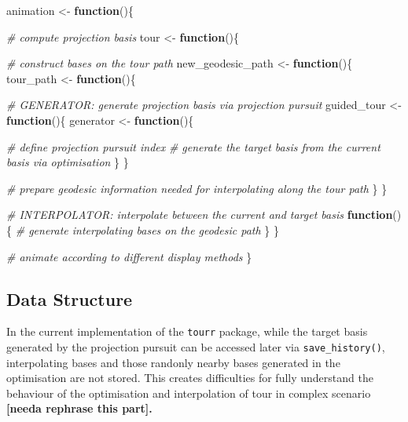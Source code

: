 \documentclass[12pt]{article}
\newenvironment{Shaded}{\begin{snugshade}}{\end{snugshade}}
\newcommand{\CommentTok}[1]{\textcolor[rgb]{0.56,0.35,0.01}{\textit{#1}}}
\newcommand{\ControlFlowTok}[1]{\textcolor[rgb]{0.13,0.29,0.53}{\textbf{#1}}}
\newcommand{\NormalTok}[1]{#1}
\newcommand{\StringTok}[1]{\textcolor[rgb]{0.31,0.60,0.02}{#1}}
\begin{document}
\begin{Shaded}
\begin{Highlighting}[]
\NormalTok{animation <-}\StringTok{ }\ControlFlowTok{function}\NormalTok{()\{}
  
  \CommentTok{# compute projection basis }
\NormalTok{  tour <-}\StringTok{ }\ControlFlowTok{function}\NormalTok{()\{}
    
    \CommentTok{# construct bases on the tour path}
\NormalTok{    new_geodesic_path <-}\StringTok{ }\ControlFlowTok{function}\NormalTok{()\{}
\NormalTok{      tour_path <-}\StringTok{ }\ControlFlowTok{function}\NormalTok{()\{}
        
        \CommentTok{# GENERATOR: generate projection basis via projection pursuit}
\NormalTok{        guided_tour <-}\StringTok{ }\ControlFlowTok{function}\NormalTok{()\{}
\NormalTok{          generator <-}\StringTok{ }\ControlFlowTok{function}\NormalTok{()\{}
            
            \CommentTok{# define projection pursuit index}
            \CommentTok{# generate the target basis from the current basis via optimisation}
\NormalTok{          \}}
\NormalTok{        \}}
        
        \CommentTok{# prepare geodesic information needed for interpolating along the tour path}
\NormalTok{      \}}
\NormalTok{    \}}
    
    \CommentTok{# INTERPOLATOR: interpolate between the current and target basis }
    \ControlFlowTok{function}\NormalTok{()\{}
      \CommentTok{# generate interpolating bases on the geodesic path}
\NormalTok{    \}}
\NormalTok{  \}}
  
  \CommentTok{# animate according to different display methods}
\NormalTok{\}}
\end{Highlighting}
\end{Shaded}

\hypertarget{data-structure}{%
\subsection{Data Structure}\label{data-structure}}

In the current implementation of the \texttt{tourr} package, while the
target basis generated by the projection pursuit can be accessed later
via \texttt{save\_history()}, interpolating bases and those randonly
nearby bases generated in the optimisation are not stored. This creates
difficulties for fully understand the behaviour of the optimisation and
interpolation of tour in complex scenario \textbf{{[}needa rephrase this
part{]}.}
\end{document}
